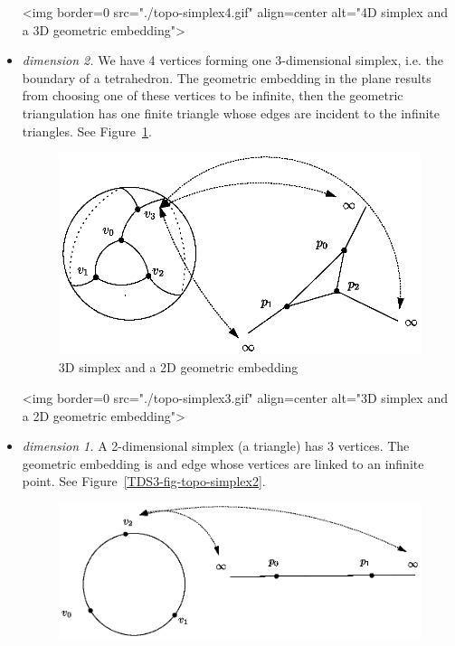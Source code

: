 \begin{itemize}
\begin{ccTexOnly}
\end{ccTexOnly}
\begin{ccHtmlOnly}
<img border=0 src="./topo-simplex4.gif" align=center
alt="4D simplex and a 3D geometric embedding">
\end{ccHtmlOnly}
\item \emph{dimension 2.} We have 4 vertices forming one 3-dimensional
simplex, i.e. the boundary of a tetrahedron. The geometric embedding in
the plane results from choosing one of these vertices to be infinite,
then the geometric triangulation has one finite triangle whose edges are
incident to the infinite triangles. See Figure~\ref{TDS3-fig-topo-simplex3}.
\begin{ccTexOnly}
\begin{figure}
\begin{center} 
\includegraphics{topo-simplex3.eps}
\end{center}
\caption{3D simplex and a 2D geometric embedding \label{TDS3-fig-topo-simplex3}}
\end{figure} 
\end{ccTexOnly}
\begin{ccHtmlOnly}
<img border=0 src="./topo-simplex3.gif" align=center
alt="3D simplex and a 2D geometric embedding">
\end{ccHtmlOnly}
\item \emph{dimension 1.} A 2-dimensional simplex (a triangle) has 3
vertices. The geometric embedding is and edge whose vertices are linked
to an infinite point.  See Figure~\ref{TDS3-fig-topo-simplex2}.
\begin{ccTexOnly}
\begin{figure}
\begin{center} 
\includegraphics{topo-simplex2.eps}

\end{center}
\end{figure}
\end{ccTexOnly}
\end{itemize}
